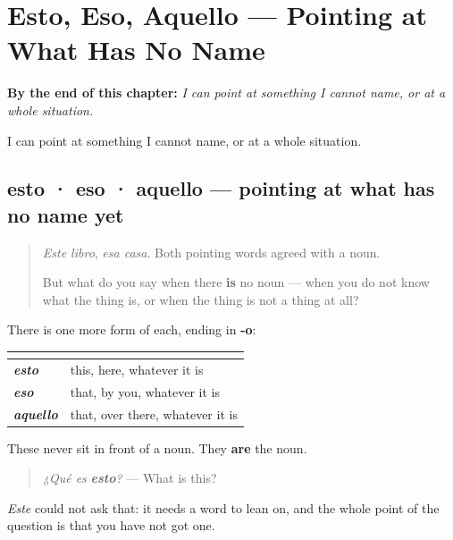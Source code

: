 
\chapter{Esto, Eso, Aquello --- Pointing at What Has No Name}
\label{ch:esto-eso-aquello}

\begin{chapteropening}
\textbf{By the end of this chapter:} \emph{I can point at something I cannot name, or at a whole situation.}

I can point at something I cannot name, or at a whole situation.
\end{chapteropening}

\section[esto · eso · aquello]{esto · eso · aquello — pointing at what has no name yet}

\label{lesson:ES-C59-esto-eso-aquello}



\begin{quote}
\emph{Este libro}, \emph{esa casa}. Both pointing words agreed with a noun.

But what do you say when there \textbf{is} no noun — when you do not know what the thing is, or when the thing is not a thing at all?
\end{quote}

\begin{grammarlens}[title={Grammar Lens: the third set}]
There is one more form of each, ending in \textbf{-o}:

\noindent
\begin{tabularx}{\linewidth}{@{}>{\raggedright\arraybackslash}X>{\raggedright\arraybackslash}X@{}}
\toprule
\textbf{} & \textbf{} \\
\midrule
\emph{\textbf{esto}} & this, here, whatever it is \\
\emph{\textbf{eso}} & that, by you, whatever it is \\
\emph{\textbf{aquello}} & that, over there, whatever it is \\
\bottomrule
\end{tabularx}

These never sit in front of a noun. They \textbf{are} the noun.

\begin{quote}
\emph{¿Qué es} \emph{\textbf{esto}}\emph{?} — What is this?
\end{quote}

\emph{Este} could not ask that: it needs a word to lean on, and the whole point of the question is that you have not got one.
\end{grammarlens}

